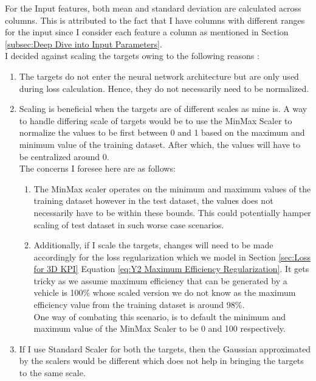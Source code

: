 \documentclass{report} %
\begin{document}
For the Input features, both mean and standard deviation are calculated across columns. 
This is attributed to the fact that I have columns with different ranges for the input since I consider each feature a column as mentioned in 
Section \ref{subsec:Deep Dive into Input Parameters}.\\

I decided against scaling the targets owing to the following reasons :
\begin{enumerate}[nosep]
    \item The targets do not enter the neural network architecture but are only used during loss calculation. Hence, they do not necessarily need to be normalized.
    \item Scaling is beneficial when the targets are of different scales as mine is. A way to handle differing scale of targets would be to use the MinMax Scaler to 
    normalize the values to be first between 0 and 1 based on the maximum and minimum value of the training dataset. After which, the values will have to be centralized 
    around 0.\\
    The concerns I foresee here are as follows:
    \begin{enumerate}[nosep]
        \item The MinMax scaler operates on the minimum and maximum values of the training dataset however in the test dataset, the values does not necessarily have to
        be within these bounds. This could potentially hamper scaling of test dataset in such worse case scenarios.
        \item Additionally, if I scale the targets, changes will need to be made accordingly for the loss regularization which we model in Section 
        \ref{sec:Loss for 3D KPI} Equation \ref{eq:Y2 Maximum Efficiency Regularization}. It gets tricky as we assume maximum efficiency that can be generated by a vehicle 
        is 100\% whose scaled version we do not know as the maximum efficiency value from the training dataset is around 98\%.\\
        One way of combating this scenario, is to default the minimum and maximum value of the MinMax Scaler to be 0 and 100 respectively.
    \end{enumerate}
    \item If I use Standard Scaler for both the targets, then the Gaussian approximated by the scalers would be different which does not help in bringing the targets 
    to the same scale.\\
\end{enumerate}
\end{document}
